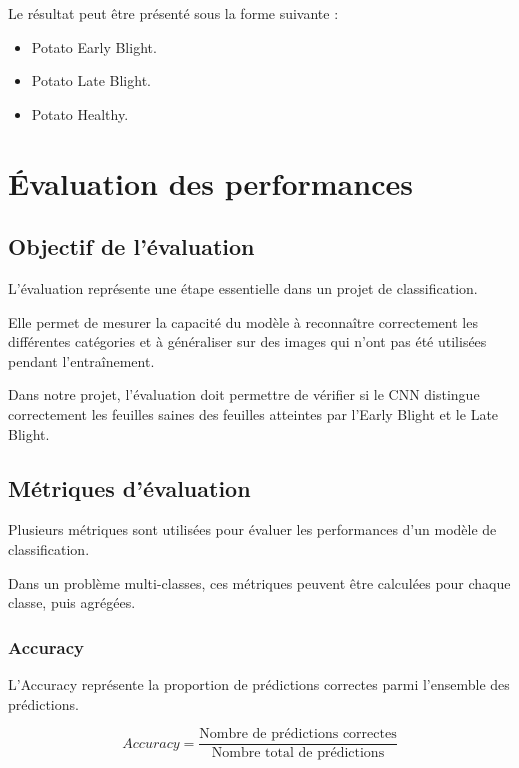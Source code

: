 \documentclass[12pt,a4paper,oneside]{report}
\begin{document}
Le résultat peut être présenté sous la forme suivante :

\begin{itemize}
    \item Potato Early Blight.
    \item Potato Late Blight.
    \item Potato Healthy.
\end{itemize}


\chapter{Évaluation des performances}

\section{Objectif de l'évaluation}

L'évaluation représente une étape essentielle dans
un projet de classification.

Elle permet de mesurer la capacité du modèle à reconnaître
correctement les différentes catégories et à généraliser
sur des images qui n'ont pas été utilisées pendant
l'entraînement.

Dans notre projet, l'évaluation doit permettre de vérifier
si le CNN distingue correctement les feuilles saines
des feuilles atteintes par l'Early Blight et le Late Blight.

\section{Métriques d'évaluation}

Plusieurs métriques sont utilisées pour évaluer
les performances d'un modèle de classification.

Dans un problème multi-classes, ces métriques peuvent
être calculées pour chaque classe, puis agrégées.

\subsection{Accuracy}

L'Accuracy représente la proportion de prédictions
correctes parmi l'ensemble des prédictions.

\[
Accuracy=\frac{\text{Nombre de prédictions correctes}}
{\text{Nombre total de prédictions}}
\]
\end{document}
